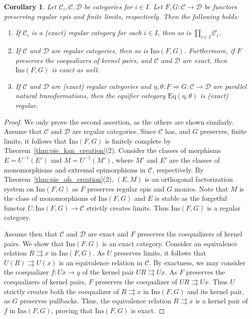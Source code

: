 \documentclass[11pt]{article}
\theoremstyle{plain}
\newtheorem{corollary}[theorem]{Corollary}
\theoremstyle{definition}
\numberwithin{equation}{section}
\newcommand{\C}{\mathcal{C}}
\newcommand{\D}{\mathcal{D}}
\newcommand{\Ins}{\mathrm{Ins}}
\newcommand{\Eq}{\mathrm{Eq}}
\begin{document}
\begin{corollary}\label{cor:liftingregularexact}
   Let $\C_i, \C,\D$ be categories for $i\in I$. Let $F,G\colon \C\to \D$ be functors preserving regular epis and finite limits, respectively. Then the following holds:
   \begin{enumerate}
       \item If $\C_i$ is a (exact) regular category for each $i\in I$, then so is $\prod_{i\in I} \C_i$.
       \item If $\C$ and $\D$ are regular categories, then so is $\Ins(F,G)$. Furthermore, if $F$ preserves the coequalizers of kernel pairs, and $\C$ and $\D$ are exact, then $\Ins(F,G)$ is exact as well.
       \item If $\C$ and $\D$ are (exact) regular categories and $\eta,\theta\colon F\Rightarrow G\colon \C\to \D$ are parallel natural transformations, then the equifier category $\Eq(\eta,\theta)$ is (exact) regular.
   \end{enumerate}
\end{corollary}
\begin{proof}
       We only prove the second assertion, as the others are shown similarly. 
       Assume that $\C$ and $\D$ are regular categories. Since $\C$ has, and $G$ preserves, finite limits, it follows that $\Ins(F,G)$ is finitely complete by Theorem~\ref{thm:pie_kan_creation}(2). Consider the classes of morphisms $E = U^{-1}(E')$ and $M = U^{-1}(M')$, where $M'$ and $E'$ are the classes of monomorphisms and extremal epimorphisms in $\C$, respectively. By Theorem~\ref{thm:pie_ofs_creation}(2), $(E,M)$ is an orthogonal factorization system on $\Ins(F,G)$ as $F$ preserves regular epis and $G$ monics. Note that $M$ is the class of monomorphisms of $\Ins(F,G)$ and $E$ is stable as the forgetful functor $U\colon \Ins(F,G)\to \C$ strictly creates limits. Thus $\Ins(F,G)$ is a regular category.

       Assume then that $\C$ and $\D$ are exact and $F$ preserves the coequalizers of kernel pairs. We show that $\Ins(F,G)$ is an exact category. Consider an equivalence relation $R\rightrightarrows x$ in $\Ins(F,G)$. As $U$ preserves limits, it follows that $U(R)\rightrightarrows U(x)$ is an equivalence relation in $\C$. By exactness, we may consider the coequalizer $f\colon Ux\to y$ of the kernel pair $UR\rightrightarrows Ux$. As $F$ preserves the coequalizers of kernel pairs, $F$ preserves the coequalizer of $UR\rightrightarrows Ux$. Thus $U$ strictly creates both the coequalizer of $R\rightrightarrows x$ in $\Ins(F,G)$ and its kernel pair, as $G$ preserves pullbacks. Thus, the equivalence relation $R\rightrightarrows x$ is a kernel pair of $f$ in $\Ins(F,G)$, proving that $\Ins(F,G)$ is exact.
\end{proof}
\end{document}
